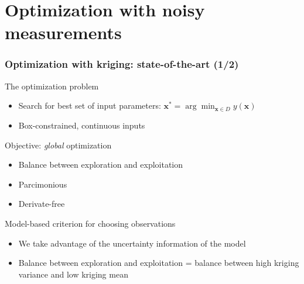 \documentclass[10pt]{beamer}
\begin{document}
\section{Optimization with noisy measurements}

\frame
{
\frametitle{Optimization with kriging: state-of-the-art (1/2)}

\begin{block}{The optimization problem}
\vspace{-1mm}
\begin{itemize}
	\item Search for best set of input parameters: $\mathbf{x}^* = \arg \min_{\mathbf{x} \in D} y(\mathbf{x})$
	\item Box-constrained, continuous inputs 
\end{itemize}
\end{block}

\begin{block}{Objective: \textit{global} optimization}
\vspace{-1mm}
\begin{itemize}
	\item Balance between exploration and exploitation
	\item Parcimonious
	\item Derivate-free
\end{itemize}
\end{block}

\begin{block}{Model-based criterion for choosing observations}
\vspace{-1mm}
\begin{itemize}
	\item We take advantage of the uncertainty information of the model
	\item Balance between exploration and exploitation = balance between high kriging variance and low kriging mean
\end{itemize}
\end{block}
}
\end{document}
